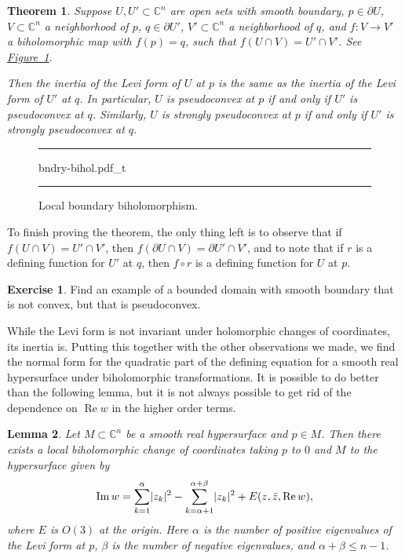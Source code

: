 \documentclass[12pt,openany]{book}
\newcommand{\avoidbreak}{\postdisplaypenalty=100}
\renewcommand{\Re}{\operatorname{Re}}
\renewcommand{\Im}{\operatorname{Im}}
\newcommand{\sabs}[1]{\lvert {#1} \rvert}
\newcommand{\C}{{\mathbb{C}}}
\theoremstyle{plain}
\newtheorem{thm}{Theorem}[section]
\newtheorem{lemma}[thm]{Lemma}
\theoremstyle{remark}
\theoremstyle{definition}
\newenvironment{exbox}{%
    \def\FrameCommand{\vrule width 1pt \relax\hspace{10pt}}%
    \MakeFramed{\advance\hsize-\width\FrameRestore}%
}{%
    \endMakeFramed
}
\newenvironment{myfig}{%
\begin{figure}[h!t]
\noindent\rule{\textwidth}{0.5pt}\vspace{12pt}\par\centering}%
{\par\noindent\rule{\textwidth}{0.5pt}
\end{figure}}
\theoremstyle{exercise}
\newtheorem{exercise}{Exercise}[section]
\theoremstyle{example}
\newcommand{\figureref}[1]{\hyperref[#1]{Figure~\ref*{#1}}}
\begin{document}
\begin{thm}
\pagebreak[2]
Suppose $U, U' \subset \C^n$ are open sets with smooth boundary,
$p \in \partial U$, $V \subset \C^n$ a neighborhood of $p$,
$q \in \partial U'$, $V' \subset \C^n$ a neighborhood of $q$,
and $f \colon V \to V'$ a biholomorphic map with $f(p) = q$, such that
$f(U \cap V) = U' \cap V'$.
See \figureref{fig:bndry-bihol}.

Then the inertia of the Levi form of $U$ at $p$ is the same as the inertia of
the Levi form of $U'$ at $q$.
In particular, $U$ is pseudoconvex at $p$ if and only if $U'$ is pseudoconvex at $q$.
Similarly,
$U$ is strongly pseudoconvex at $p$ if and only if $U'$ is strongly pseudoconvex at $q$.
\end{thm}

\begin{myfig}
{bndry-bihol.pdf_t}
\caption{Local boundary biholomorphism.\label{fig:bndry-bihol}}
\end{myfig}

To finish proving the theorem, the only thing left is to observe that if
$f(U \cap V) = U' \cap V'$, then $f(\partial U \cap V) = \partial U' \cap
V'$, and to note that if $r$ is a defining function for $U'$ at $q$,
then $f \circ r$ is a defining function for $U$ at $p$.

\begin{exbox}
\begin{exercise}
Find an example of a bounded domain with smooth boundary that is not convex,
but that is pseudoconvex.
\end{exercise}
\end{exbox}

While the Levi form is not invariant under holomorphic changes of coordinates,
its inertia is.
Putting this together with the other observations we made,
we find the normal form for the
quadratic part of the defining equation for a smooth real hypersurface
under biholomorphic transformations.
It is possible to do better than the following lemma, but it is not always possible
to get rid of the dependence on $\Re w$ in the higher order terms.

\begin{lemma} \label{lemma:normformquad}
Let $M \subset \C^n$ be a smooth real hypersurface and $p \in M$.  Then there
exists a local biholomorphic change of coordinates taking $p$ to $0$
and $M$ to the hypersurface given by
\begin{equation*}
\Im w = \sum_{k=1}^\alpha \sabs{z_k}^2 - \sum_{k=\alpha+1}^{\alpha+\beta}
\sabs{z_k}^2 +
E(z,\bar{z},\Re w) ,
\avoidbreak
\end{equation*}
where $E$ is $O(3)$ at the origin.
Here $\alpha$ is the number of positive eigenvalues of the Levi form at $p$,
$\beta$ is the number of negative eigenvalues, and $\alpha+\beta \leq n-1$.
\end{lemma}
\end{document}

